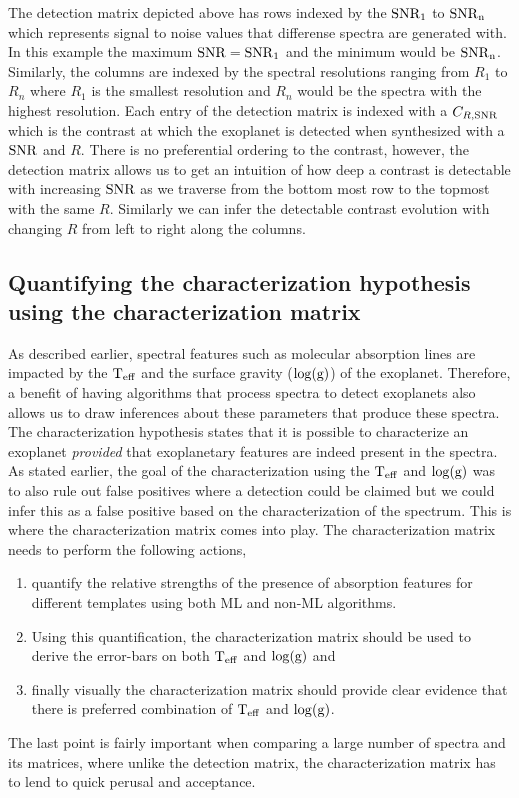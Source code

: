 The detection matrix depicted above has rows indexed by the $\rm{SNR_1}$ to $\rm{SNR}_n$ which represents signal to noise values that differense spectra are generated with. 
In this example the maximum $\rm{SNR}=\rm{SNR}_1$ and the minimum would be $\rm{SNR}_n$. 
Similarly, the columns are indexed by the spectral resolutions ranging from $R_1$ to $R_n$ where $R_1$ is the smallest resolution and $R_n$ would be the spectra with the highest resolution.
Each entry of the detection matrix is indexed with a $C_{R,\rm{SNR}}$ which is the contrast at which the exoplanet is detected when synthesized with a $\rm{SNR}$ and $R$.
There is no preferential ordering to the contrast, however, the detection matrix allows us to get an intuition of how deep a contrast is detectable with increasing $\rm{SNR}$ as we traverse from the bottom most row to the topmost with the same $R$.
Similarly we can infer the detectable contrast evolution with changing $R$ from left to right along the columns.
\subsection{Quantifying the characterization hypothesis using the characterization matrix}
As described earlier, spectral features such as molecular absorption lines are impacted by the $\rm{T_{eff}}$ and the surface gravity ($\rm{\log(g)}$) of the exoplanet.
Therefore, a benefit of having algorithms that process spectra to detect exoplanets also allows us to draw inferences about these parameters that produce these spectra.
The characterization hypothesis states that it is possible to characterize an exoplanet \textit{provided} that exoplanetary features are indeed present in the spectra.
As stated earlier, the goal of the characterization using the $\rm{T_{eff}}$ and $\rm{\log(g)}$ was to also rule out false positives where a detection could be claimed but we could infer this as a false positive based on the characterization of the spectrum.
This is where the characterization matrix comes into play.
The characterization matrix needs to perform the following actions,
\begin{enumerate}
    \item quantify the relative strengths of the presence of absorption features for different templates using both ML and non-ML algorithms.
    \item Using this quantification, the characterization matrix should be used to derive the error-bars on both $\rm{T_{eff}}$ and $\rm{\log(g)}$ and
    \item finally visually the characterization matrix should provide clear evidence that there is preferred combination of $\rm{T_{eff}}$ and $\rm{\log(g)}$.
\end{enumerate}
The last point is fairly important when comparing a large number of spectra and its matrices, where unlike the detection matrix, the characterization matrix has to lend to quick perusal and acceptance.

